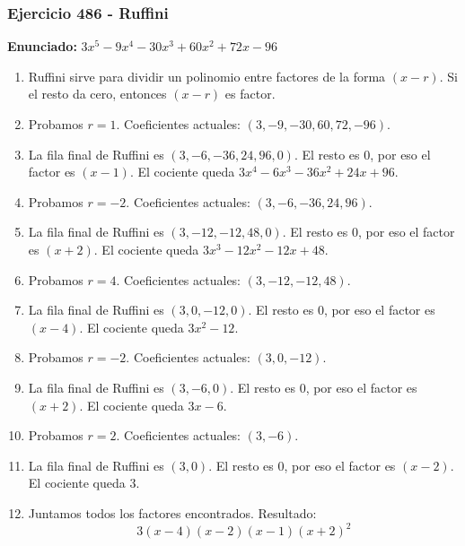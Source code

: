 \documentclass[11pt,a4paper]{article}
\begin{document}
\subsubsection*{Ejercicio 486 - Ruffini}
\textbf{Enunciado:} $ 3 x^{5} - 9 x^{4} - 30 x^{3} + 60 x^{2} + 72 x - 96 $\par
\begin{enumerate}[leftmargin=2em]
\item Ruffini sirve para dividir un polinomio entre factores de la forma \((x-r)\). Si el resto da cero, entonces \((x-r)\) es factor.
\item Probamos \(r=1\). Coeficientes actuales: \((3, -9, -30, 60, 72, -96)\).
\item La fila final de Ruffini es \((3, -6, -36, 24, 96, 0)\). El resto es \(0\), por eso el factor es \((x-1)\). El cociente queda \(3 x^{4} - 6 x^{3} - 36 x^{2} + 24 x + 96\).
\item Probamos \(r=-2\). Coeficientes actuales: \((3, -6, -36, 24, 96)\).
\item La fila final de Ruffini es \((3, -12, -12, 48, 0)\). El resto es \(0\), por eso el factor es \((x+2)\). El cociente queda \(3 x^{3} - 12 x^{2} - 12 x + 48\).
\item Probamos \(r=4\). Coeficientes actuales: \((3, -12, -12, 48)\).
\item La fila final de Ruffini es \((3, 0, -12, 0)\). El resto es \(0\), por eso el factor es \((x-4)\). El cociente queda \(3 x^{2} - 12\).
\item Probamos \(r=-2\). Coeficientes actuales: \((3, 0, -12)\).
\item La fila final de Ruffini es \((3, -6, 0)\). El resto es \(0\), por eso el factor es \((x+2)\). El cociente queda \(3 x - 6\).
\item Probamos \(r=2\). Coeficientes actuales: \((3, -6)\).
\item La fila final de Ruffini es \((3, 0)\). El resto es \(0\), por eso el factor es \((x-2)\). El cociente queda \(3\).
\item Juntamos todos los factores encontrados. Resultado: \[\boxed{3 \left(x - 4\right) \left(x - 2\right) \left(x - 1\right) \left(x + 2\right)^{2}}\]
\end{enumerate}

\vspace{0.2cm}
\end{document}
